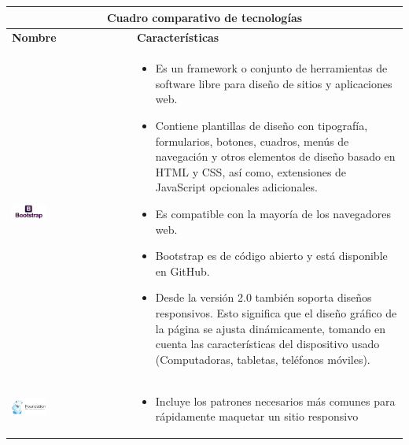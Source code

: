 \newpage
\begin{table}[b!]
    \centering
      \begin{tabular}{|p{1cm}|l}
        \hline
        \multicolumn{2}{|c|}{{\bf Cuadro comparativo de tecnologías}} \\ 
        \hline
          \multicolumn{1}{|p{4cm}|}{{\bf Nombre}} & 
		  \multicolumn{1}{p{10cm}|}{{\bf Características}}\\
		 \hline
          \multicolumn{1}{|p{5cm}|}{\includegraphics[width=0.3\textwidth]{images/bootstrap}} & 
          \multicolumn{1}{p{10cm}|}{\begin{itemize} 
       \vspace{-20mm}
          \item Es un framework o conjunto de herramientas de software libre para diseño de sitios y aplicaciones web. 
        \item Contiene plantillas de diseño con tipografía, formularios, botones, cuadros, menús de navegación y otros elementos de diseño basado en HTML y CSS, así como, extensiones de JavaScript opcionales adicionales.
        \item Es compatible con la mayoría de los navegadores web.
        \item Bootstrap es de código abierto y está disponible en GitHub. 
        \item Desde la versión 2.0 también soporta diseños responsivos. Esto significa que el diseño gráfico de la página se ajusta dinámicamente, tomando en cuenta las características del dispositivo usado (Computadoras, tabletas, teléfonos móviles).
        \cite{34}
      \end{itemize}} \\
        \hline
          \multicolumn{1}{|p{5cm}|}{\includegraphics[width=0.3\textwidth]{images/foundation}} & 
          \multicolumn{1}{p{10cm}|}{ 
          \begin{itemize}
                 \vspace{-20mm}
          \setlist[itemize]{noitemsep, topsep=0pt}  
          	\item Incluye los patrones necesarios más comunes para rápidamente maquetar un sitio responsivo

\end{itemize}}
\end{tabular}
\end{table}
